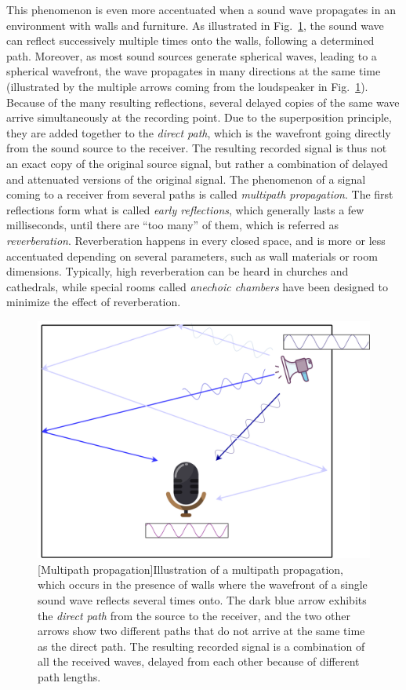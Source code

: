 This phenomenon is even more accentuated when a sound wave propagates in an environment with walls and furniture. As illustrated in Fig.~\ref{fig:multipathPropagation}, the sound wave can reflect successively multiple times onto the walls, following a determined path. Moreover, as most sound sources generate spherical waves, leading to a spherical wavefront, the wave propagates in many directions at the same time (illustrated by the multiple arrows coming from the loudspeaker in Fig.~\ref{fig:multipathPropagation}). Because of the many resulting reflections, several delayed copies of the same wave arrive simultaneously at the recording point. Due to the superposition principle, they are added together to the \textit{direct path}, which is the wavefront going directly from the sound source to the receiver. The resulting recorded signal is thus not an exact copy of the original source signal, but rather a combination of delayed and attenuated versions of the original signal. The phenomenon of a signal coming to a receiver from several paths is called \textit{multipath propagation}. The first reflections form what is called \textit{early reflections}, which generally lasts a few milliseconds, until there are ``too many'' of them, which is referred as \textit{reverberation}. Reverberation happens in every closed space, and is more or less accentuated depending on several parameters, such as wall materials or room dimensions. Typically, high reverberation can be heard in churches and cathedrals, while special rooms called \textit{anechoic chambers} have been designed to minimize the effect of reverberation.

\begin{figure}[t]
    \begin{center}
    \includegraphics[width=0.6\linewidth]{Images/chap1/multipathPropagation.png}
    [Multipath propagation]{Illustration of a multipath propagation, which occurs in the presence of walls where the wavefront of a single sound wave reflects several times onto. The dark blue arrow exhibits the \textit{direct path} from the source to the receiver, and the two other arrows show two different paths that do not arrive at the same time as the direct path. The resulting recorded signal is a combination of all the received waves, delayed from each other because of different path lengths.}
    \label{fig:multipathPropagation}
    \end{center}
\end{figure}

